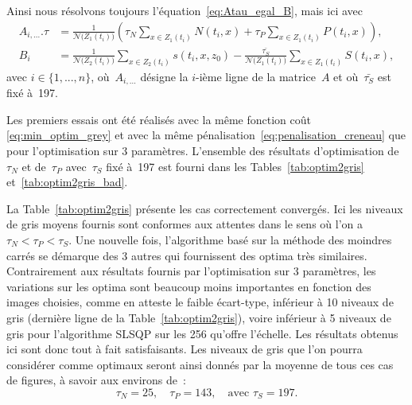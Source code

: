 \documentclass[main.tex]{subfiles}
\begin{document}
Ainsi nous résolvons toujours l'équation~\eqref{eq:Atau_egal_B}, mais ici avec
\begin{equation}
\label{eq:corresp_A_integ}
\begin{aligned}
A_{i,...}.\tau & = \frac{1}{\mathcal{N}\big(Z_1(t_i)\big)}\left( \tau_N\!\!\sum_{x\in Z_1(t_i)}\!\!N(t_i,x) + \tau_P\!\!\sum_{x\in Z_1(t_i)}\!\!P(t_i,x) \right), \\
B_i &= \frac{1}{\mathcal{N}\big(Z_2(t_i)\big)} \sum_{x\in Z_2(t_i)}\!\! s(t_i,x,z_0) - \frac{\bar{\tau_S}}{\mathcal{N}\big(Z_1(t_i)\big)}\sum_{x\in Z_1(t_i)}\!\!S(t_i,x),
\end{aligned}
\end{equation}
avec $i \in \{1,...,n\}$, 
où~$A_{i,...}$ désigne la $i$-ième ligne de la matrice~$A$ et où~$\bar{\tau_S}$ est fixé à~197.


Les premiers essais ont été réalisés avec la même fonction coût \eqref{eq:min_optim_grey} et avec la même pénalisation~\eqref{eq:penalisation_creneau} que pour l'optimisation sur 3 paramètres. 
L'ensemble des résultats d'optimisation de~$\tau_N$ et de~$\tau_P$ avec~$\tau_S$ fixé à~197  %
est fourni dans les Tables~\ref{tab:optim2gris} et~\ref{tab:optim2gris_bad}. 


La Table~\ref{tab:optim2gris} présente les cas correctement convergés. Ici les niveaux de gris moyens fournis sont conformes aux attentes dans le sens où l'on a~$\tau_N{<}\tau_P{<}\tau_S$.  Une nouvelle fois, l'algorithme basé sur la méthode des moindres carrés se démarque des 3 autres qui fournissent des optima très similaires. 
Contrairement aux résultats fournis par l'optimisation sur 3 paramètres, les variations sur les optima sont beaucoup moins importantes en fonction des images choisies, comme en atteste le faible écart-type, inférieur à 10 niveaux de gris (\cf dernière ligne de la Table~\ref{tab:optim2gris}), voire inférieur à 5 niveaux de gris pour l'algorithme SLSQP sur les 256 qu'offre l'échelle.  
Les résultats obtenus ici sont donc tout à fait satisfaisants.  
Les niveaux de gris que l'on pourra considérer comme optimaux seront ainsi donnés par la moyenne de tous ces cas de figures, à savoir aux environs de~: 
\begin{equation}
\tau_N=25, \quad \tau_P=143, \quad \textrm{avec\ } \tau_S = 197. 
\end{equation}
\end{document}
